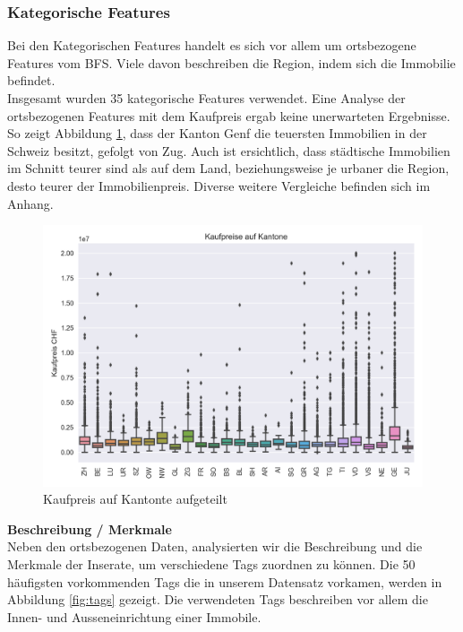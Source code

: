 \subsubsection{Kategorische Features}
Bei den Kategorischen Features handelt es sich vor allem um ortsbezogene Features vom BFS. Viele davon beschreiben die Region, indem sich die Immobilie befindet.\\
Insgesamt wurden 35 kategorische Features verwendet. Eine Analyse der ortsbezogenen Features mit dem Kaufpreis ergab keine unerwarteten Ergebnisse. So zeigt Abbildung \ref{fig:cantons}, dass der Kanton Genf die teuersten Immobilien in der Schweiz besitzt, gefolgt von Zug.
Auch ist ersichtlich, dass städtische Immobilien im Schnitt teurer sind als auf dem Land, beziehungsweise je urbaner die Region, desto teurer der Immobilienpreis. Diverse weitere Vergleiche befinden sich im Anhang.\\[2ex]
\begin{figure}[ht]
\centering
\includegraphics[width=\textwidth]{images/boxPlot_cantons.png}
\caption[Kaufpreis auf Kantonte aufgeteilt]{Kaufpreis auf Kantonte aufgeteilt}%
\label{fig:cantons}
\end{figure}
\newline
%
\textbf{Beschreibung / Merkmale}\\
Neben den ortsbezogenen Daten, analysierten wir die Beschreibung und die Merkmale der Inserate, um verschiedene Tags zuordnen zu können. Die 50 häufigsten vorkommenden Tags die in unserem Datensatz vorkamen, werden in Abbildung \ref{fig:tags} gezeigt. Die verwendeten Tags beschreiben vor allem die Innen- und Ausseneinrichtung einer Immobile.
%
